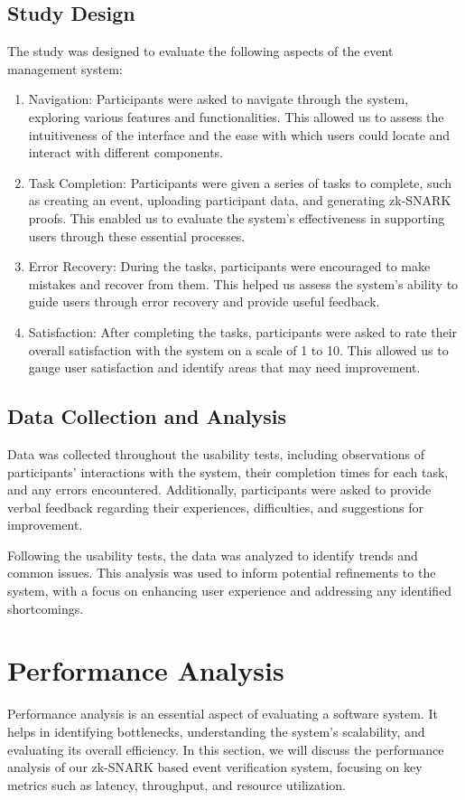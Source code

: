 \subsection{Study Design}
The study was designed to evaluate the following aspects of the event management system:

\begin{enumerate}
  \item Navigation: Participants were asked to navigate through the system, exploring various features and functionalities. This allowed us to assess the intuitiveness of the interface and the ease with which users could locate and interact with different components.
  \item Task Completion: Participants were given a series of tasks to complete, such as creating an event, uploading participant data, and generating zk-SNARK proofs. This enabled us to evaluate the system's effectiveness in supporting users through these essential processes.
  \item Error Recovery: During the tasks, participants were encouraged to make mistakes and recover from them. This helped us assess the system's ability to guide users through error recovery and provide useful feedback.
  \item Satisfaction: After completing the tasks, participants were asked to rate their overall satisfaction with the system on a scale of 1 to 10. This allowed us to gauge user satisfaction and identify areas that may need improvement.
\end{enumerate}

\subsection{Data Collection and Analysis}
Data was collected throughout the usability tests, including observations of participants' interactions with the system, their completion times for each task, and any errors encountered. Additionally, participants were asked to provide verbal feedback regarding their experiences, difficulties, and suggestions for improvement.

Following the usability tests, the data was analyzed to identify trends and common issues. This analysis was used to inform potential refinements to the system, with a focus on enhancing user experience and addressing any identified shortcomings.

\section{Performance Analysis}
Performance analysis is an essential aspect of evaluating a software system. It helps in identifying bottlenecks, understanding the system's scalability, and evaluating its overall efficiency. In this section, we will discuss the performance analysis of our zk-SNARK based event verification system, focusing on key metrics such as latency, throughput, and resource utilization.

